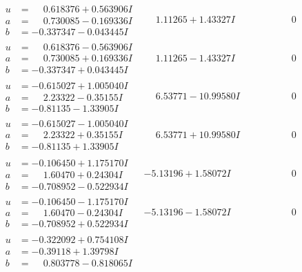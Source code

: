 \documentclass[1p]{elsarticle_modified}
\theoremstyle{definition}
\begin{document}
$$\begin{array}{c|c|c}
\begin{aligned}
u &= \phantom{-}0.618376 + 0.563906 I \\
a &= \phantom{-}0.730085 - 0.169336 I \\
b &= -0.337347 - 0.043445 I\end{aligned}
 & \phantom{-}1.11265 + 1.43327 I & \phantom{-0.000000 } 0 \\ \hline\begin{aligned}
u &= \phantom{-}0.618376 - 0.563906 I \\
a &= \phantom{-}0.730085 + 0.169336 I \\
b &= -0.337347 + 0.043445 I\end{aligned}
 & \phantom{-}1.11265 - 1.43327 I & \phantom{-0.000000 } 0 \\ \hline\begin{aligned}
u &= -0.615027 + 1.005040 I \\
a &= \phantom{-}2.23322 - 0.35155 I \\
b &= -0.81135 - 1.33905 I\end{aligned}
 & \phantom{-}6.53771 - 10.99580 I & \phantom{-0.000000 } 0 \\ \hline\begin{aligned}
u &= -0.615027 - 1.005040 I \\
a &= \phantom{-}2.23322 + 0.35155 I \\
b &= -0.81135 + 1.33905 I\end{aligned}
 & \phantom{-}6.53771 + 10.99580 I & \phantom{-0.000000 } 0 \\ \hline\begin{aligned}
u &= -0.106450 + 1.175170 I \\
a &= \phantom{-}1.60470 + 0.24304 I \\
b &= -0.708952 - 0.522934 I\end{aligned}
 & -5.13196 + 1.58072 I & \phantom{-0.000000 } 0 \\ \hline\begin{aligned}
u &= -0.106450 - 1.175170 I \\
a &= \phantom{-}1.60470 - 0.24304 I \\
b &= -0.708952 + 0.522934 I\end{aligned}
 & -5.13196 - 1.58072 I & \phantom{-0.000000 } 0 \\ \hline\begin{aligned}
u &= -0.322092 + 0.754108 I \\
a &= -0.39118 + 1.39798 I \\
b &= \phantom{-}0.803778 - 0.818065 I\end{aligned}

\end{array}$$
\end{document}
